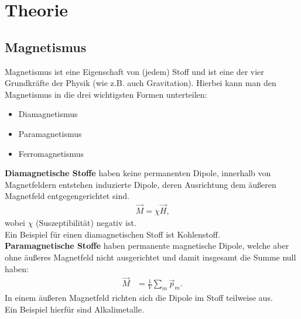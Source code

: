 \section{Theorie}
\subsection{Magnetismus}
Magnetismus ist eine Eigenschaft von (jedem) Stoff und ist eine der vier Grundkräfte der Physik (wie z.B. auch Gravitation). Hierbei kann man den Magnetismus in die drei wichtigsten Formen unterteilen:
\begin{itemize}
\item Diamagnetismus
\item Paramagnetismus
\item Ferromagnetismus
\end{itemize}
\textbf{Diamagnetische Stoffe} haben keine permanenten Dipole, innerhalb von Magnetfeldern entstehen induzierte Dipole, deren Ausrichtung dem äußeren Magnetfeld entgegengerichtet sind.
\begin{align*}
\vec{M}=\chi \vec{H}\text{,}
\end{align*}
wobei $\chi$ (Suszeptibilität) negativ ist.\\
Ein Beispiel für einen diamagnetischen Stoff ist Kohlenstoff. \\
\textbf{Paramagnetische Stoffe} haben permanente magnetische Dipole, welche aber ohne äußeres Magnetfeld nicht ausgerichtet und damit insgesamt die Summe null haben:
\begin{align*}
\vec{M}&=\frac{1}{V}\sum_m \vec{p}_m\text{.}
\end{align*}
In einem äußeren Magnetfeld richten sich die Dipole im Stoff teilweise aus.\\
Ein Beispiel hierfür sind Alkalimetalle.

